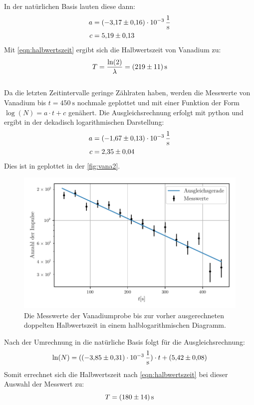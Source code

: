In der natürlichen Basis lauten diese dann:
\begin{align*}
  a &= \SI{-3.17(16)e-3}{\per\second}\\
  c &= \num{5.19 \pm 0.13}
\end{align*}
Mit \eqref{eqn:halbwertszeit} ergibt sich die Halbwertszeit von Vanadium zu:
\begin{equation*}
  T = \frac{\ln(2)}{\lambda} = \SI{219\pm 11}{\second}
\end{equation*}
\\
Da die letzten Zeitintervalle geringe Zählraten haben, werden die Messwerte von Vanadium bis $t=\SI{450}{\second}$ nochmale geplottet und mit einer Funktion der Form $\log(N) = a\cdot t +c $ genähert.
Die Ausgleichsrechnung erfolgt mit python und ergibt in der dekadisch logarithmischen Darstellung:
\begin{align*}
  a &= \SI{-1.67(13)e-3}{\per\second}\\
  c &= \num{2.35 \pm 0.04}
\end{align*}
Dies ist in geplottet in der \autoref{fig:vana2}.
\begin{figure}
  \centering
  \includegraphics{build/vana2.pdf}
  \caption{Die Messwerte der Vanadiumprobe bis zur vorher ausgerechneten doppelten Halbwertszeit in einem halblogarithmischen Diagramm.}
  \label{fig:vana2}
\end{figure}
Nach der Umrechnung in die natürliche Basis folgt für die Ausgleichsrechnung:
\begin{equation*}
  \ln(N) = (\SI{-3.85(31)e-3}{\per\second}) \cdot t + (\num{5.42 \pm 0.08})
\end{equation*}
Somit errechnet sich die Halbwertszeit nach \eqref{eqn:halbwertszeit} bei dieser Auswahl der Messwert zu:
\begin{equation*}
  T = \SI{180 \pm 14}{\second}
\end{equation*}

